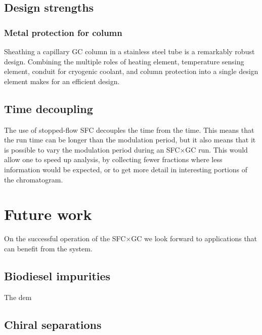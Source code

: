 \subsection{Design strengths}

\subsubsection{Metal protection for column}

Sheathing a capillary GC column in a stainless steel tube is a remarkably robust
design. Combining the multiple roles of heating element, temperature sensing
element, conduit for cryogenic coolant, and column protection into a single
design element makes for an efficient design.

\subsection{Time decoupling}

The use of stopped-flow SFC decouples the \oneD time from the \twoD time. This
means that the \twoD run time can be longer than the modulation period, but it
also means that it is possible to vary the modulation period during an SFC×GC
run. This would allow one to speed up analysis, by collecting fewer fractions
where less information would be expected, or to get more detail in interesting
portions of the \oneD chromatogram.

\section{Future work}

On the successful operation of the SFC×GC we look forward to applications that
can benefit from the system. 

\subsection{Biodiesel impurities}

The dem
\subsection{Chiral separations}

\todos
